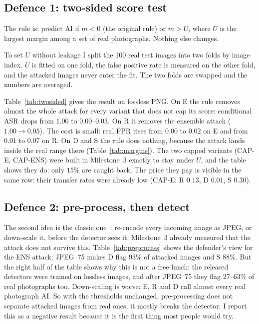 \documentclass[journal]{IEEEtran}
\begin{document}


\subsection{Defence 1: two-sided score test}
\label{sec:defence-1}

The rule is: predict AI if $m<0$ (the original rule) or $m>U$, where $U$ is the largest margin among a set of real photographs. Nothing else changes.

To set $U$ without leakage I split the 100 real test images into two folds by image index. $U$ is fitted on one fold, the false positive rate is measured on the other fold, and the attacked images never enter the fit. The two folds are swapped and the numbers are averaged.

Table~\ref{tab:twosided} gives the result on lossless PNG. On E the rule removes almost the whole attack for every variant that does not cap its score: conditional ASR drops from $1.00$ to $0.00$--$0.03$. On R it removes the ensemble attack ($1.00\rightarrow0.05$). The cost is small: real FPR rises from $0.00$ to $0.02$ on E and from $0.01$ to $0.07$ on R. On D and S the rule does nothing, because the attack lands inside the real range there (Table~\ref{tab:margins}). The two capped variants (CAP-E, CAP-ENS) were built in Milestone~3 exactly to stay under $U$, and the table shows they do: only $15\%$ are caught back. The price they pay is visible in the same row: their transfer rates were already low (CAP-E: R $0.13$, D $0.01$, S $0.30$).

\subsection{Defence 2: pre-process, then detect}
\label{sec:defence-2}

The second idea is the classic one~\cite{dziugaite2016jpg,guo2018input}: re-encode every incoming image as JPEG, or down-scale it, before the detector sees it. Milestone~3 already measured that the attack does not survive this. Table~\ref{tab:preprocess} shows the defender's view for the ENS attack. JPEG~75 makes D flag $93\%$ of attacked images and S $88\%$. But the right half of the table shows why this is not a free lunch: the released detectors were trained on lossless images, and after JPEG~75 they flag $27$--$63\%$ of real photographs too. Down-scaling is worse: E, R and D call almost every real photograph AI. So with the thresholds unchanged, pre-processing does not separate attacked images from real ones; it mostly breaks the detector. I report this as a negative result because it is the first thing most people would try.
\end{document}
